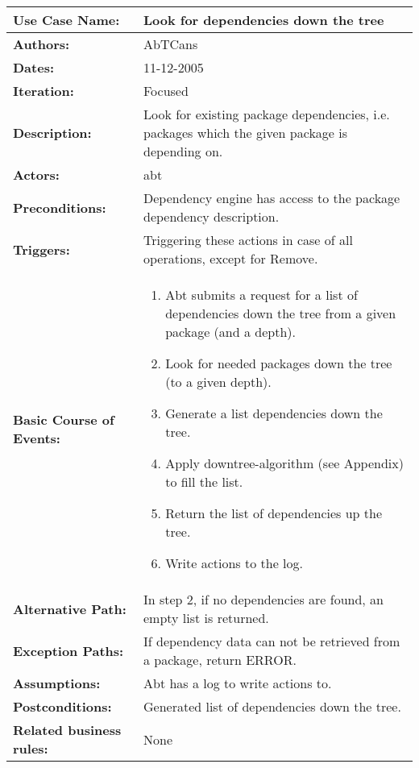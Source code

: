 \begin{tabularx}{\linewidth}{|l|X|}
\hline
\textbf{Use Case Name:} & \textbf{Look for dependencies down the tree} \\
\hline
\textbf{Authors:} & AbTCans\\
\hline
\textbf{Dates:} & 11-12-2005\\
\hline
\textbf{Iteration:} & Focused\\
\hline
\textbf{Description:} & Look for existing package dependencies, i.e. packages which the given package is depending on.\\
\hline
\textbf{Actors:} & abt \\ 
\hline
\textbf{Preconditions:} & Dependency engine has access to the package dependency description.\\
\hline
\textbf{Triggers:} & Triggering these actions in case of all operations, except for Remove.\\
\hline
\textbf{Basic Course of Events:} & 
\begin{minipage}{\linewidth} 
  \vspace{0.05em}
  \begin{enumerate}
   \item Abt submits a request for a list of dependencies down the tree from a given package (and a depth).
   \item Look for needed packages down the tree (to a given depth).
   \item Generate a list dependencies down the tree.
   \item Apply downtree-algorithm (see Appendix) to fill the list.
   \item Return the list of dependencies up the tree.
   \item Write actions to the log.
  \end{enumerate}
  \vspace{0.05em}
\end{minipage}
\\
\hline 
\textbf{Alternative Path:} & In step 2, if no dependencies are found, an empty list is returned.\\
\hline
\textbf{Exception Paths:} & If dependency data can not be retrieved from a package, return ERROR. \\
\hline
\textbf{Assumptions:} & Abt has a log to write actions to. \\
\hline
\textbf{Postconditions:} & Generated list of dependencies down the tree.\\
\hline
\textbf{Related business rules:} & None\\
\hline
\end{tabularx}


 